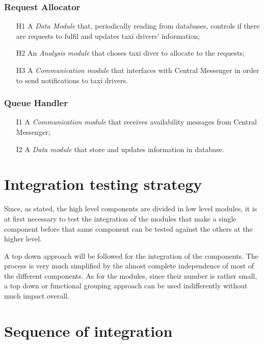 \subsubsection{Request Allocator}
\begin{itemize}
\item [H1] A \emph{Data Module} that, periodically reading from databases, controls if there are requests to fulfil and updates taxi drivers’ information;
\item [H2] An \emph{Analysis module} that choses taxi diver to allocate to the requests;
\item [H3] A \emph{Communication module} that interfaces with Central Messenger in order to send notifications to taxi drivers.
\end{itemize}

\subsubsection{Queue Handler} 
\begin{itemize}
\item [I1] A \emph{Communication module} that receives availability messages from Central Messenger;
\item [I2] A \emph{Data module} that store and updates information in database.
\end{itemize}


\section{Integration testing strategy}
Since, as stated, the high level components are divided in low level modules, it is at first necessary to test the integration of the modules that make a single component before that same component can be tested against the others at the higher level.

A top down approach will be followed for the integration of the components. The process is very much simplified by the almost complete independence of most of the different components. As for the modules, since their number is rather small, a top down or functional grouping approach can be used indifferently without much impact overall.


\section{Sequence of integration}

